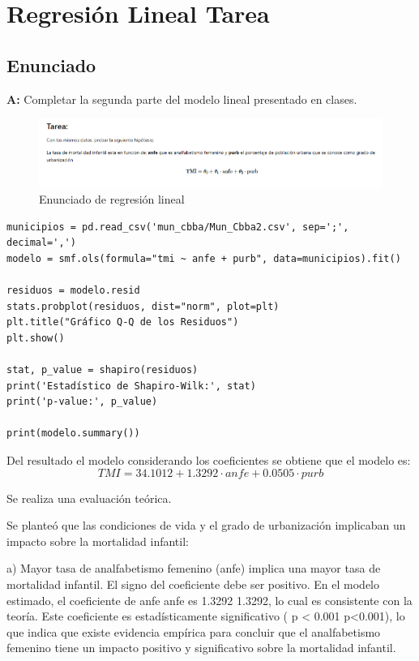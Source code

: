 \newpage
\section{Regresión Lineal Tarea}
\subsection{Enunciado}
\textbf{A:} Completar la segunda parte del modelo lineal presentado en clases.
\begin{figure}[h!]
    \centering
    \includegraphics[width=1\textwidth]{images/statement.png}
    \caption{Enunciado de regresión lineal}
    \label{fig:regresion_lineal_statement}
\end{figure}

\begin{verbatim}
municipios = pd.read_csv('mun_cbba/Mun_Cbba2.csv', sep=';', decimal=',')
modelo = smf.ols(formula="tmi ~ anfe + purb", data=municipios).fit()

residuos = modelo.resid
stats.probplot(residuos, dist="norm", plot=plt)
plt.title("Gráfico Q-Q de los Residuos")
plt.show()

stat, p_value = shapiro(residuos)
print('Estadístico de Shapiro-Wilk:', stat)
print('p-value:', p_value)

print(modelo.summary())
\end{verbatim}

Del resultado el modelo considerando los coeficientes se obtiene que el modelo es:
$$
TMI = 34.1012 + 1.3292 \cdot anfe + 0.0505 \cdot purb
$$



Se realiza una evaluación teórica.

Se planteó que las condiciones de vida y el grado de urbanización implicaban un impacto sobre la mortalidad infantil:

a) Mayor tasa de analfabetismo femenino (anfe) 
implica una mayor tasa de mortalidad infantil.
El signo del coeficiente debe ser positivo. En el modelo estimado, 
el coeficiente de anfe anfe es  1.3292 1.3292, lo cual es consistente con la teoría. 
Este coeficiente es estadísticamente significativo ( p < 0.001 p<0.001), 
lo que indica que existe evidencia empírica para concluir que el analfabetismo 
femenino tiene un impacto positivo y significativo sobre la mortalidad infantil.

